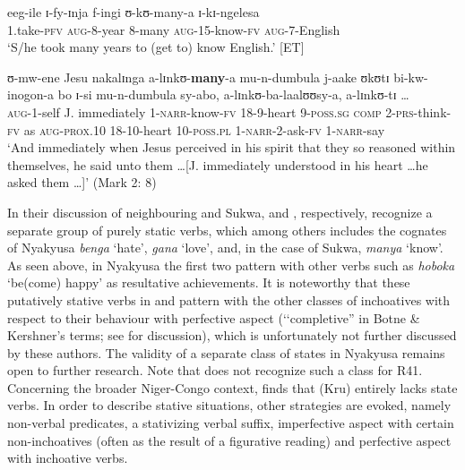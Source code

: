 \begin{exe}
\ex \label{exManyaTakeXTime} \gll eeg-ile ɪ-fy-ɪnja f-ingi ʊ-kʊ-many-a ɪ-kɪ-ngelesa\\
1.take-\textsc{pfv} \textsc{aug}-8-year 8-many \textsc{aug}-15-know-\textsc{fv} \textsc{aug}-7-English\\
\glt \lq S/he took many years to (get to) know English.' [ET] 

\ex \label{exManyaNarrative} \gll ʊ-mw-ene Jesu nakalɪnga a-lɪnkʊ-\textbf{many}-a mu-n-dumbula j-aake ʊkʊtɪ bi-kw-inogon-a bo ɪ-si mu-n-dumbula sy-abo, a-lɪnkʊ-ba-laalʊʊsy-a, a-lɪnkʊ-tɪ \ldots\\
\textsc{aug}-1-self J. immediately 1-\textsc{narr}-know-\textsc{fv} 18-9-heart 9-\textsc{poss.sg} \textsc{comp} 2-\textsc{prs}-think-\textsc{fv} as \textsc{aug}-\textsc{prox.10} 18-10-heart 10-\textsc{poss.pl} 1-\textsc{narr}-2-ask-\textsc{fv} 1-\textsc{narr}-say {}\\
\glt \lq And immediately when Jesus perceived in his spirit that they so reasoned within themselves, he said unto them \ldots [J. immediately understood in his heart \ldots he asked them \ldots]' (Mark 2: 8)
\end{exe}

In their discussion of neighbouring  and Sukwa, \citet{BotneR2008} and \citet{KershnerT2002}, respectively, recognize a separate group of purely static verbs, which among others includes the cognates of Nyakyusa \textit{benga} \lq hate', \textit{gana} \lq love', and, in the case of Sukwa, \textit{manya} \lq know'. As seen above, in Nyakyusa the first two pattern with other verbs such as \textit{hoboka} \lq be(come) happy' as resultative achievements. It is noteworthy that these putatively stative verbs in  and  pattern with the other classes of inchoatives with respect to their behaviour with perfective aspect (\lq\lq completive'' in Botne \& Kershner's terms; see  for discussion), which is unfortunately not further discussed by these authors. The validity of a separate class of states in Nyakyusa remains open to further research. Note that \citet{SeidelF2008} does not recognize such a class for  R41. Concerning the broader Niger-Congo context, \citet[ch. 5.4]{ToewsC2015} finds that  (Kru) entirely lacks state verbs. In order to describe stative situations, other strategies are evoked, namely non-verbal predicates, a stativizing verbal suffix, imperfective aspect with certain non-inchoatives (often as the result of a figurative reading) and perfective aspect with inchoative verbs.
